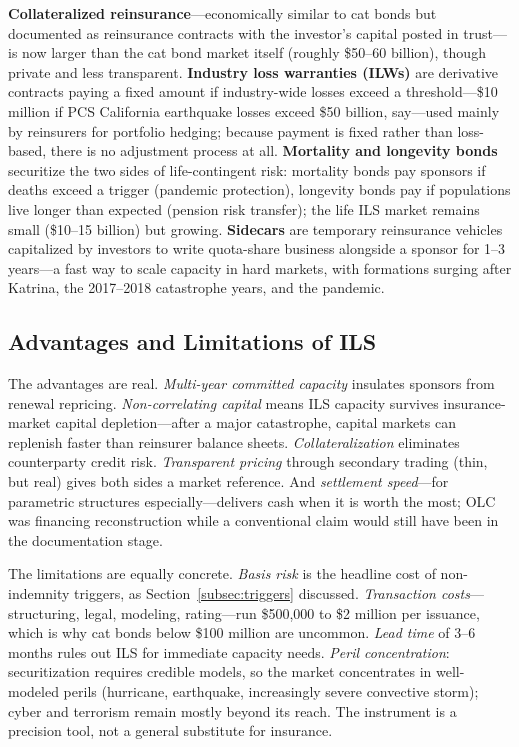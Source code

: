 \documentclass[11pt,openany]{book}
\begin{document}
\textbf{Collateralized reinsurance}---economically similar to cat bonds but
documented as reinsurance contracts with the investor's capital posted in
trust---is now larger than the cat bond market itself (roughly \$50--60
billion), though private and less transparent. \textbf{Industry loss
warranties (ILWs)} are derivative contracts paying a fixed amount if
industry-wide losses exceed a threshold---\$10 million if PCS California
earthquake losses exceed \$50 billion, say---used mainly by reinsurers for
portfolio hedging; because payment is fixed rather than loss-based, there is
no adjustment process at all. \textbf{Mortality and longevity bonds}
securitize the two sides of life-contingent risk: mortality bonds pay
sponsors if deaths exceed a trigger (pandemic protection), longevity bonds
pay if populations live longer than expected (pension risk transfer); the
life ILS market remains small (\$10--15 billion) but growing.
\textbf{Sidecars} are temporary reinsurance vehicles capitalized by investors
to write quota-share business alongside a sponsor for 1--3 years---a fast way
to scale capacity in hard markets, with formations surging after Katrina, the
2017--2018 catastrophe years, and the pandemic.

\subsection{Advantages and Limitations of ILS}
\label{subsec:ils-advantages}

The advantages are real. \emph{Multi-year committed capacity} insulates
sponsors from renewal repricing. \emph{Non-correlating capital} means ILS
capacity survives insurance-market capital depletion---after a major
catastrophe, capital markets can replenish faster than reinsurer balance
sheets. \emph{Collateralization} eliminates counterparty credit risk.
\emph{Transparent pricing} through secondary trading (thin, but real) gives
both sides a market reference. And \emph{settlement speed}---for parametric
structures especially---delivers cash when it is worth the most; OLC was
financing reconstruction while a conventional claim would still have been in
the documentation stage.

The limitations are equally concrete. \emph{Basis risk} is the headline cost
of non-indemnity triggers, as Section~\ref{subsec:triggers} discussed.
\emph{Transaction costs}---structuring, legal, modeling, rating---run
\$500,000 to \$2 million per issuance, which is why cat bonds below \$100
million are uncommon. \emph{Lead time} of 3--6 months rules out ILS for
immediate capacity needs. \emph{Peril concentration}: securitization requires
credible models, so the market concentrates in well-modeled perils
(hurricane, earthquake, increasingly severe convective storm); cyber and
terrorism remain mostly beyond its reach. The instrument is a precision tool,
not a general substitute for insurance.
\end{document}
